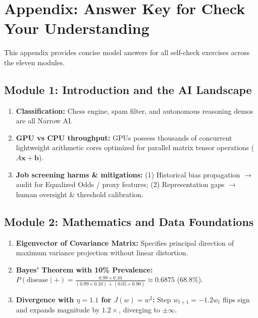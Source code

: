 \documentclass[11pt,a4paper]{article}
\begin{document}
	\clearpage
	\section*{Appendix: Answer Key for Check Your Understanding}

	This appendix provides concise model answers for all self-check exercises across the eleven modules.

	\subsection*{Module 1: Introduction and the AI Landscape}
	\begin{enumerate}
		\item \textbf{Classification:} Chess engine, spam filter, and autonomous reasoning demos are all Narrow AI.
		\item \textbf{GPU vs CPU throughput:} GPUs possess thousands of concurrent lightweight arithmetic cores optimized for parallel matrix tensor operations ($A \mathbf{x} + \mathbf{b}$).
		\item \textbf{Job screening harms \& mitigations:} (1) Historical bias propagation $\to$ audit for Equalized Odds / proxy features; (2) Representation gaps $\to$ human oversight \& threshold calibration.
	\end{enumerate}

	\subsection*{Module 2: Mathematics and Data Foundations}
	\begin{enumerate}
		\item \textbf{Eigenvector of Covariance Matrix:} Specifies principal direction of maximum variance projection without linear distortion.
		\item \textbf{Bayes' Theorem with 10\% Prevalence:} $P(\text{disease}\mid +) = \frac{0.99 \times 0.10}{(0.99 \times 0.10) + (0.05 \times 0.90)} \approx 0.6875$ (68.8\%).
		\item \textbf{Divergence with $\eta=1.1$ for $J(w)=w^2$:} Step $w_{t+1} = -1.2 w_t$ flips sign and expands magnitude by $1.2\times$, diverging to $\pm\infty$.
	\end{enumerate}
\end{document}
